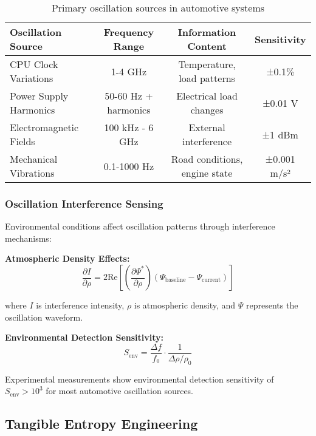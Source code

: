 \documentclass[11pt,a4paper]{article}
\begin{document}
\begin{table}[H]
\centering
\begin{tabular}{@{}lccc@{}}
\toprule
\textbf{Oscillation Source} & \textbf{Frequency Range} & \textbf{Information Content} & \textbf{Sensitivity} \\
\midrule
CPU Clock Variations & 1-4 GHz & Temperature, load patterns & ±0.1\% \\
Power Supply Harmonics & 50-60 Hz + harmonics & Electrical load changes & ±0.01 V \\
Electromagnetic Fields & 100 kHz - 6 GHz & External interference & ±1 dBm \\
Mechanical Vibrations & 0.1-1000 Hz & Road conditions, engine state & ±0.001 m/s² \\
\bottomrule
\end{tabular}
\caption{Primary oscillation sources in automotive systems}
\label{tab:oscillation_sources}
\end{table}

\subsubsection{Oscillation Interference Sensing}

Environmental conditions affect oscillation patterns through interference mechanisms:

\textbf{Atmospheric Density Effects:}
\begin{equation}
\frac{\partial I}{\partial \rho} = 2\text{Re}\left[\left(\frac{\partial \Psi^*}{\partial \rho}\right)(\Psi_{\text{baseline}} - \Psi_{\text{current}})\right]
\end{equation}

where $I$ is interference intensity, $\rho$ is atmospheric density, and $\Psi$ represents the oscillation waveform.

\textbf{Environmental Detection Sensitivity:}
\begin{equation}
S_{\text{env}} = \frac{\Delta f}{f_0} \cdot \frac{1}{\Delta \rho / \rho_0}
\end{equation}

Experimental measurements show environmental detection sensitivity of $S_{\text{env}} > 10^3$ for most automotive oscillation sources.

\subsection{Tangible Entropy Engineering}
\end{document}
